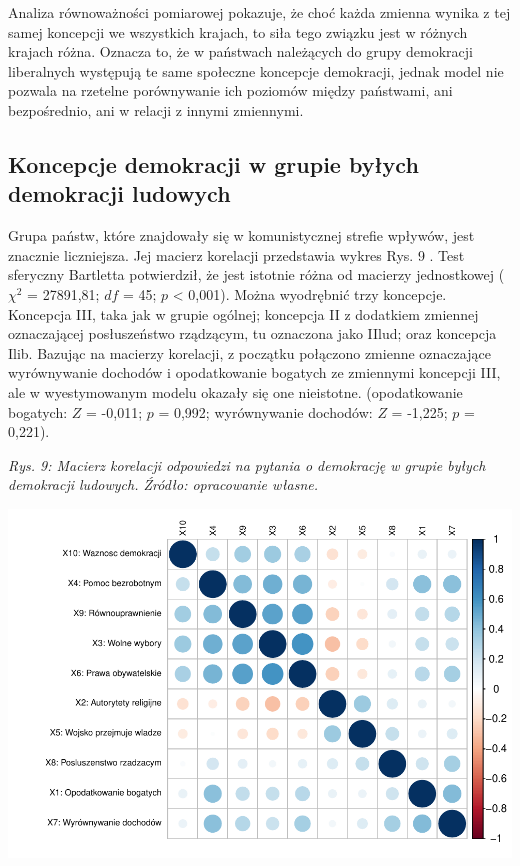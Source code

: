 \documentclass[12pt]{article}
\begin{document}
Analiza równoważności pomiarowej pokazuje, że choć każda zmienna wynika z tej samej koncepcji we wszystkich krajach, to siła tego związku jest w różnych krajach różna. Oznacza to, że w państwach należących do grupy demokracji liberalnych występują te same społeczne koncepcje demokracji, jednak model nie pozwala na rzetelne porównywanie ich poziomów między państwami, ani bezpośrednio, ani w relacji z innymi zmiennymi.

\hypertarget{koncepcje-demokracji-w-grupie-byux142ych-demokracji-ludowych}{%
\subsection{Koncepcje demokracji w grupie byłych demokracji ludowych}\label{koncepcje-demokracji-w-grupie-byux142ych-demokracji-ludowych}}

Grupa państw, które znajdowały się w komunistycznej strefie wpływów, jest znacznie liczniejsza. Jej macierz korelacji przedstawia wykres Rys. 9 . Test sferyczny Bartletta potwierdził, że jest istotnie różna od macierzy jednostkowej (\(\chi^2\) = 27891,81; \(df\) = 45; \(p\) \textless{} 0,001). Można wyodrębnić trzy koncepcje. Koncepcja III, taka jak w grupie ogólnej; koncepcja II z dodatkiem zmiennej oznaczającej posłuszeństwo rządzącym, tu oznaczona jako IIlud; oraz koncepcja Ilib. Bazując na macierzy korelacji, z początku połączono zmienne oznaczające wyrównywanie dochodów i opodatkowanie bogatych ze zmiennymi koncepcji III, ale w wyestymowanym modelu okazały się one nieistotne. (opodatkowanie bogatych: \(Z\) = -0,011; \(p\) = 0,992; wyrównywanie dochodów: \(Z\) = -1,225; \(p\) = 0,221).

\emph{Rys. 9: Macierz korelacji odpowiedzi na pytania o demokrację w grupie byłych demokracji ludowych. Źródło: opracowanie własne.}

\begin{flushleft}\includegraphics{text_ASA_files/figure-latex/cor-matrix-east-1} \end{flushleft}
\end{document}
